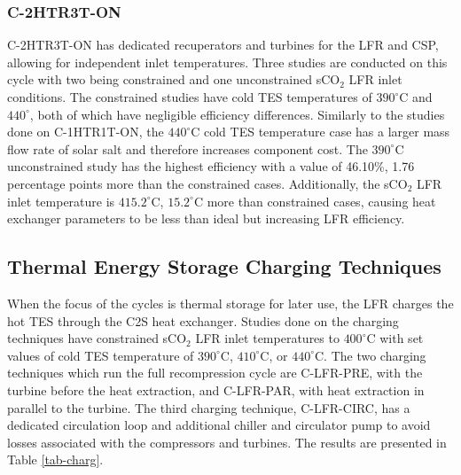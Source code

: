 \begin{paracol}{2}
\subsubsection{C-2HTR3T-ON}
C-2HTR3T-ON has dedicated recuperators and turbines for the LFR and CSP, allowing for independent inlet temperatures. Three studies are conducted on this cycle with two being constrained and one unconstrained sCO$_2$ LFR inlet conditions. The constrained studies have cold TES temperatures of $390^{\circ}$C and $440^{\circ}$, both of which have negligible efficiency differences. Similarly to the studies done on C-1HTR1T-ON, the $440^{\circ}$C cold TES temperature case has a larger mass flow rate of solar salt and therefore increases component cost. The $390^{\circ}$C unconstrained study has the highest efficiency with a value of 46.10\%, 1.76 percentage points more than the constrained cases. Additionally, the sCO$_2$ LFR inlet temperature is $415.2^{\circ}$C, $15.2^{\circ}$C more than constrained cases, causing heat exchanger parameters to be less than ideal but increasing LFR efficiency.

\subsection{Thermal Energy Storage Charging Techniques}

When the focus of the cycles is thermal storage for later use, the LFR charges the hot TES through the C2S heat exchanger. Studies done on the charging techniques have constrained sCO$_2$ LFR inlet temperatures to $400^{\circ}$C with set values of cold TES temperature of $390^{\circ}$C, $410^{\circ}$C, or $440^{\circ}$C. The two charging techniques which run the full recompression cycle are C-LFR-PRE, with the turbine before the heat extraction, and C-LFR-PAR, with heat extraction in parallel to the turbine. The third charging technique, C-LFR-CIRC, has a dedicated circulation loop and additional chiller and circulator pump to avoid losses associated with the compressors and turbines. The results are presented in Table \ref{tab-charg}.  




\end{paracol}
